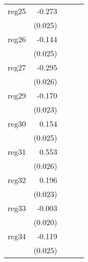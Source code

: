 {\begin{longtable}{l*{4}{D{.}{.}{-1}}}
\addlinespace
reg25       &      -0.273\sym{***}&                     &                     &                     \\
            &     (0.025)         &                     &                     &                     \\
\addlinespace
reg26       &      -0.144\sym{***}&                     &                     &                     \\
            &     (0.025)         &                     &                     &                     \\
\addlinespace
reg27       &      -0.295\sym{***}&                     &                     &                     \\
            &     (0.026)         &                     &                     &                     \\
\addlinespace
reg29       &      -0.170\sym{***}&                     &                     &                     \\
            &     (0.023)         &                     &                     &                     \\
\addlinespace
reg30       &       0.154\sym{***}&                     &                     &                     \\
            &     (0.025)         &                     &                     &                     \\
\addlinespace
reg31       &       0.553\sym{***}&                     &                     &                     \\
            &     (0.026)         &                     &                     &                     \\
\addlinespace
reg32       &       0.196\sym{***}&                     &                     &                     \\
            &     (0.023)         &                     &                     &                     \\
\addlinespace
reg33       &      -0.003         &                     &                     &                     \\
            &     (0.020)         &                     &                     &                     \\
\addlinespace
reg34       &      -0.119\sym{***}&                     &                     &                     \\
            &     (0.025)         &                     &                     &                     \\

\end{longtable}}
